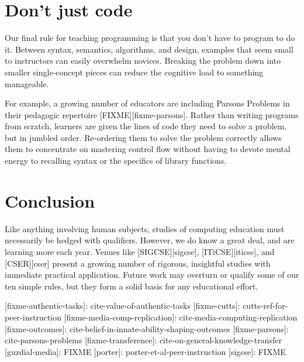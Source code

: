 \documentclass{article}
\begin{document}
\section{Don't just code}

Our final rule for teaching programming is that you don't have to program to do it.
Between syntax, semantics, algorithms, and design,
examples that seem small to instructors can easily overwhelm novices.
Breaking the problem down into smaller single-concept pieces can reduce the cognitive load to something manageable.

For example,
a growing number of educators are including Parsons Problems in their pedagogic repertoire [FIXME][fixme-parsons].
Rather than writing programs from scratch,
learners are given the lines of code they need to solve a problem,
but in jumbled order.
Re-ordering them to solve the problem correctly allows them to concentrate on mastering control flow
without having to devote mental energy to recalling syntax
or the specifics of library functions.

\section*{Conclusion}

Like anything involving human subjects,
studies of computing education must necessarily be hedged with qualifiers.
However,
we do know a great deal,
and are learning more each year.
Venues like [SIGCSE][sigcse],
[ITiCSE][iticse],
and [CSER][cser]
present a growing number of rigorous, insightful studies
with immediate practical application.
Future work may overturn or qualify some of our ten simple rules,
but they form a solid basis for any educational effort.

[fixme-authentic-tasks]: cite-value-of-authentic-tasks
[fixme-cutts]: cutts-ref-for-peer-instruction
[fixme-media-comp-replication]: cite-media-computing-replication
[fixme-outcomes]: cite-belief-in-innate-ability-shaping-outcomes
[fixme-parsons]: cite-parsons-problems
[fixme-transference]: cite-on-general-knowledge-transfer
[guzdial-media]: FIXME
[porter]: porter-et-al-peer-instruction
[sigcse]: FIXME



\end{document}
